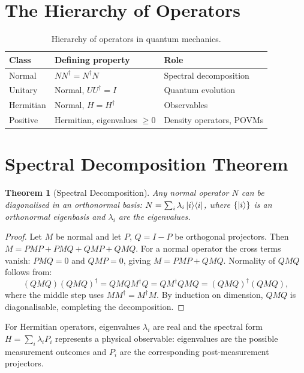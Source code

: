 \documentclass[12pt, a4paper, oneside]{report}
\theoremstyle{plain}
\newtheorem{theorem}{Theorem}[chapter]
\theoremstyle{definition}
\theoremstyle{remark}
\newcommand{\oket}[2]{\ket{#1}\!\bra{#2}}
\begin{document}
\section{The Hierarchy of Operators}

\begin{table}[h]
\centering
\caption{Hierarchy of operators in quantum mechanics.}
\label{tab:operators}
\begin{tabular}{lll}
\toprule
\textbf{Class} & \textbf{Defining property} & \textbf{Role} \\
\midrule
Normal    & $NN^\dagger = N^\dagger N$      & Spectral decomposition \\
Unitary   & Normal, $UU^\dagger = I$        & Quantum evolution \\
Hermitian & Normal, $H = H^\dagger$         & Observables \\
Positive  & Hermitian, eigenvalues $\geq 0$ & Density operators, POVMs \\
\bottomrule
\end{tabular}
\end{table}

\section{Spectral Decomposition Theorem}

\begin{theorem}[Spectral Decomposition]
\label{thm:spectral}
Any normal operator $N$ can be diagonalised in an orthonormal basis:
$N = \sum_i \lambda_i \oket{i}{i}$,
where $\{\ket{i}\}$ is an orthonormal eigenbasis and $\lambda_i$ are the eigenvalues.
\end{theorem}

\begin{proof}
Let $M$ be normal and let $P$, $Q = I-P$ be orthogonal projectors. Then
$M = PMP + PMQ + QMP + QMQ$.
For a normal operator the cross terms vanish: $PMQ = 0$ and $QMP = 0$, giving $M = PMP + QMQ$.
Normality of $QMQ$ follows from:
\[
  (QMQ)(QMQ)^\dagger = QMQM^\dagger Q = QM^\dagger QMQ = (QMQ)^\dagger(QMQ),
\]
where the middle step uses $MM^\dagger = M^\dagger M$. By induction on dimension, $QMQ$ is
diagonalisable, completing the decomposition.
\end{proof}

For Hermitian operators, eigenvalues $\lambda_i$ are real and the spectral form
$H = \sum_i \lambda_i P_i$ represents a physical observable: eigenvalues are the possible
measurement outcomes and $P_i$ are the corresponding post-measurement projectors.
\end{document}

